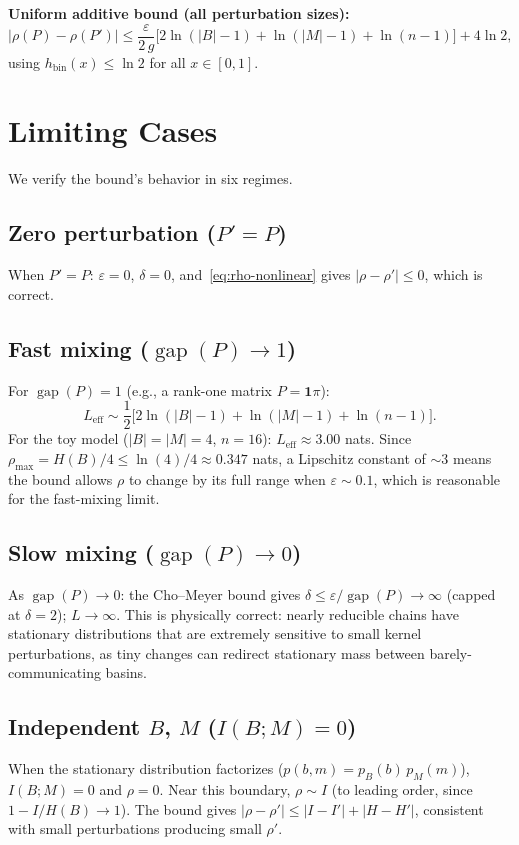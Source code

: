 \documentclass[11pt,a4paper]{article}
\DeclareMathOperator{\gap}{gap}
\begin{document}
\noindent
\textbf{Uniform additive bound (all perturbation sizes):}
\begin{equation}\label{eq:uniform}
  |\rho(P) - \rho(P')| \le
  \frac{\varepsilon}{2\,g}\bigl[2\ln(|B|-1) + \ln(|M|-1) + \ln(n-1)\bigr]
  + 4\ln 2,
\end{equation}
using $h_{\mathrm{bin}}(x) \le \ln 2$ for all $x \in [0,1]$.


\section{Limiting Cases}\label{sec:limits}

We verify the bound's behavior in six regimes.

\subsection{Zero perturbation ($P' = P$)}
When $P' = P$: $\varepsilon = 0$, $\delta = 0$,
and~\eqref{eq:rho-nonlinear} gives $|\rho - \rho'| \le 0$, which is correct.

\subsection{Fast mixing ($\gap(P) \to 1$)}
For $\gap(P) = 1$ (e.g., a rank-one matrix $P = \mathbf{1}\pi$):
\[
  L_{\mathrm{eff}} \sim \frac{1}{2}\bigl[2\ln(|B|-1) + \ln(|M|-1) + \ln(n-1)\bigr].
\]
For the toy model ($|B| = |M| = 4$, $n = 16$):
$L_{\mathrm{eff}} \approx 3.00$ nats.  Since $\rho_{\max} = H(B)/4
\le \ln(4)/4 \approx 0.347$ nats, a Lipschitz constant of ${\sim}3$
means the bound allows $\rho$ to change by its full range when
$\varepsilon \sim 0.1$, which is reasonable for the fast-mixing limit.

\subsection{Slow mixing ($\gap(P) \to 0$)}
As $\gap(P) \to 0$:
the Cho--Meyer bound gives
$\delta \le \varepsilon/\gap(P) \to \infty$ (capped at $\delta = 2$);
$L \to \infty$.
This is physically correct: nearly reducible chains have stationary
distributions that are extremely sensitive to small kernel perturbations,
as tiny changes can redirect stationary mass between barely-communicating
basins.

\subsection{Independent $B$, $M$ ($I(B;M) = 0$)}
When the stationary distribution factorizes ($p(b,m) = p_B(b)\,p_M(m)$),
$I(B;M) = 0$ and $\rho = 0$.  Near this boundary, $\rho \sim I$
(to leading order, since $1 - I/H(B) \to 1$).
The bound gives $|\rho - \rho'| \le |I - I'| + |H - H'|$, consistent
with small perturbations producing small $\rho'$.
\end{document}
